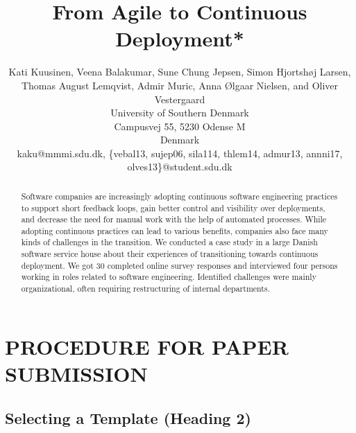 \documentclass[letterpaper, 10 pt, conference]{ieeeconf}  %
\title{\LARGE \bf
From Agile to Continuous Deployment*
}
\author {Kati Kuusinen, Veena Balakumar, Sune Chung Jepsen, Simon Hjortsh{\o}j Larsen, \\Thomas August Lemqvist, Admir Muric, Anna {\O}lgaar Nielsen, and Oliver Vestergaard\\
University of Southern Denmark\\
Campusvej 55, 5230 Odense M\\
Denmark\\
kaku@mmmi.sdu.dk, \{vebal13, sujep06, sila114, thlem14, admur13, annni17, olves13\}@student.sdu.dk 
%
}
\begin{document}
\maketitle
\thispagestyle{empty}
\pagestyle{empty}


\begin{abstract}

Software companies are increasingly adopting continuous software engineering practices to support short feedback loops, gain better control and visibility over deployments, and decrease the need for manual work with the help of automated processes. While adopting continuous practices can lead to various benefits, companies also face many kinds of challenges in the transition. We conducted a case study in a large Danish software service house about their experiences of transitioning towards continuous deployment. We got 30 completed online survey responses and interviewed four persons working in roles related to software engineering. Identified challenges were mainly organizational, often requiring restructuring of internal departments. 

\end{abstract}















\section{PROCEDURE FOR PAPER SUBMISSION}

\subsection{Selecting a Template (Heading 2)}




\end{document}
